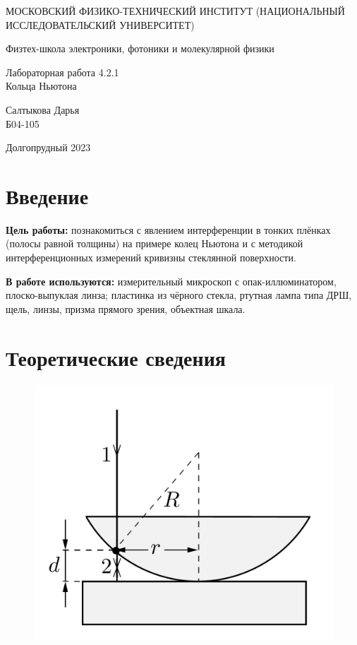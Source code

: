 \documentclass[a4paper,12pt]{article} %
\begin{document}
	
	\begin{titlepage}
	\begin{center}
		{\large МОСКОВСКИЙ ФИЗИКО-ТЕХНИЧЕСКИЙ ИНСТИТУТ (НАЦИОНАЛЬНЫЙ ИССЛЕДОВАТЕЛЬСКИЙ УНИВЕРСИТЕТ)}
	\end{center}
	\begin{center}
		{\large Физтех-школа электроники, фотоники и молекулярной физики}
	\end{center}
	
	
	\vspace{4.5cm}
	{\huge
		\begin{center}
			{Лабораторная работа 4.2.1}\\
			Кольца Ньютона
		\end{center}
	}
	\vspace{2cm}
	\begin{flushright}
		{\LARGE Салтыкова Дарья \\
			\vspace{0.5cm}
			Б04-105}
	\end{flushright}
	\vspace{8cm}
	\begin{center}
		Долгопрудный 2023
	\end{center}
\end{titlepage}

\section{Введение}

\noindent \textbf{Цель работы:} познакомиться с явлением интерференции в тонких плёнках (полосы равной толщины) на примере колец Ньютона и с методикой интерференционных измерений кривизны стеклянной поверхности.
	 

\medskip
	
\noindent \textbf{В работе используются:} измерительный микроскоп с опак-иллюминатором, плоско-выпуклая линза; пластинка из чёрного стекла, ртутная лампа типа ДРШ, щель, линзы, призма прямого зрения, объектная шкала.
	

\section{Теоретические сведения}

		\begin{figure}[h!]
 	\centering 	\includegraphics[width=0.4\linewidth]{ring.png}
 \end{figure}
\end{document}
